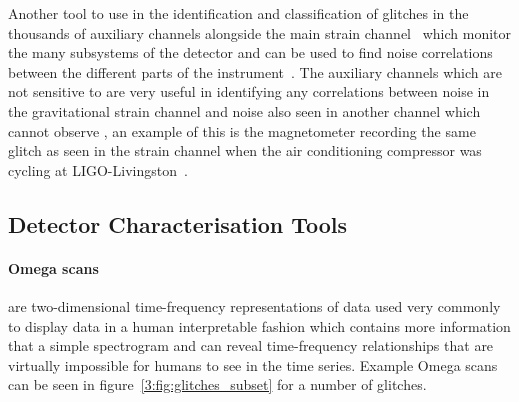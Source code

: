 
Another tool to use in the identification and classification of glitches in the thousands of auxiliary channels alongside the main strain channel~\cite{iDQ:2020} which monitor the many subsystems of the detector and can be used to find noise correlations between the different parts of the instrument~\cite{DQ_vetoes:2017}. The auxiliary channels which are not sensitive to \gws are very useful in identifying any correlations between noise in the gravitational strain channel and noise also seen in another channel which cannot observe \gws, an example of this is the magnetometer recording the same glitch as seen in the \gwadj strain channel when the air conditioning compressor was cycling at LIGO-Livingston~\cite{Nuttall:2018}.

\subsection{\label{3:sec:detchar-tools}Detector Characterisation Tools}

\paragraph{Omega scans}

are two-dimensional time-frequency representations of \gwadj data used very commonly to display \gwadj data in a human interpretable fashion which contains more information that a simple spectrogram and can reveal time-frequency relationships that are virtually impossible for humans to see in the time series. Example Omega scans can be seen in figure~\ref{3:fig:glitches_subset} for a number of glitches.

